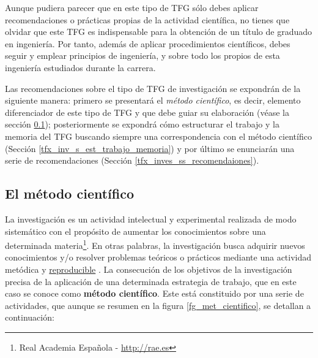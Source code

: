 Aunque pudiera parecer que en este tipo de TFG sólo debes aplicar recomendaciones o prácticas propias de la actividad científica, no tienes que olvidar que este TFG es indispensable para la obtención de un título de graduado en ingeniería. Por tanto, además de aplicar procedimientos científicos, debes seguir y emplear principios de ingeniería, y sobre todo los propios de esta ingeniería estudiados durante la carrera.

Las recomendaciones sobre el tipo de TFG de investigación se expondrán de la siguiente manera: primero se presentará el \textit{método científico}, es decir, elemento diferenciador de este tipo de TFG y que debe guiar su elaboración (véase la sección \ref{tfx_inv_s_met_cientifico}); posteriormente se expondrá cómo estructurar el trabajo y la memoria del TFG buscando siempre una correspondencia con el método científico (Sección  \ref{tfx_inv_s_est_trabajo_memoria}) y por último se enunciarán una serie de recomendaciones (Sección \ref{tfx_inves_ss_recomendaiones}).

\subsection{El método científico}\label{tfx_inv_s_met_cientifico}

La investigación es un actividad intelectual y experimental realizada de modo sistemático con el propósito de aumentar los conocimientos sobre una determinada materia\footnote{Real Academia Española - \url{http://rae.es}}. En otras palabras, la investigación busca adquirir nuevos conocimientos y/o resolver problemas teóricos o prácticos mediante una actividad metódica y \underline {reproducible} \cite{NationalAcademies2019}. La consecución de los objetivos de la investigación precisa de la aplicación de una determinada estrategia de trabajo, que en este caso se conoce como \textbf{método científico}. Este está constituido por una serie de actividades, que aunque se resumen en la figura \ref{fg_met_cientifico}, se detallan a continuación:

